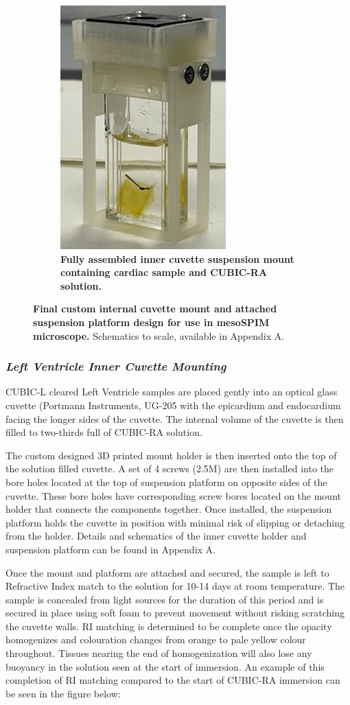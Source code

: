 \begin{figure}[H]
    \begin{subfigure}[d]{1\textwidth}
    \centering
    \includegraphics[width=0.25\linewidth]{Images/AssembledMountCUBIC.jpg}
    \caption{\textbf{Fully assembled inner cuvette suspension mount containing cardiac sample and CUBIC-RA solution.}}
    \label{fig:enter-label}
    \end{subfigure}

    \caption{\textbf{Final custom internal cuvette mount and attached suspension platform design for use in mesoSPIM microscope.} Schematics to scale, available in Appendix A.}
\end{figure}


\subsubsection{\textit{Left Ventricle Inner Cuvette Mounting}}

CUBIC-L cleared Left Ventricle samples are placed gently into an optical glass cuvette (Portmann Instruments, UG-205 with the epicardium and endocardium facing the longer sides of the cuvette. The internal volume of the cuvette is then filled to two-thirds full of CUBIC-RA solution. 

The custom designed 3D printed mount holder is then inserted onto the top of the solution filled cuvette. A set of 4 screws (2.5M) are then installed into the bore holes located at the top of suspension platform on opposite sides of the cuvette. These bore holes have corresponding screw bores located on the mount holder that connects the components together. Once installed, the suspension platform holds the cuvette in position with minimal risk of slipping or detaching from the holder. Details and schematics of the inner cuvette holder and suspension platform can be found in Appendix A. 

Once the mount and platform are attached and secured, the sample is left to Refractive Index match to the solution for 10-14 days at room temperature. The sample is concealed from light sources for the duration of this period and is secured in place using soft foam to prevent movement without risking scratching the cuvette walls. RI matching is determined to be complete once the opacity homogenizes and colouration changes from orange to pale yellow colour throughout. Tissues nearing the end of homogenization will also lose any buoyancy in the solution seen at the start of immersion. An example of this completion of RI matching compared to the start of CUBIC-RA immersion can be seen in the figure below:

